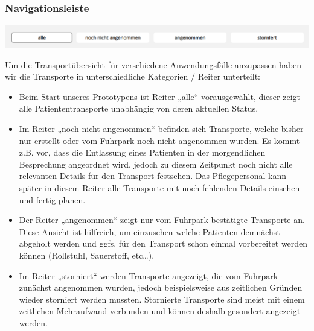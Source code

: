 \documentclass[a4paper, ngerman, 12pt]{scrartcl}
\begin{document}
\subsubsection{Navigationsleiste}
\begin{center}
\begin{minipage}{0.8\textwidth}
	\centering
	\includegraphics[width=\textwidth]{Bilder/ap1Nav.png}
	\label{img:ap1nav}
\end{minipage}
\end{center}
Um die Transportübersicht für verschiedene Anwendungsfälle anzupassen haben wir die Transporte in unterschiedliche Kategorien / Reiter unterteilt:\\
\begin{itemize}
\item Beim Start unseres Prototypens ist Reiter „alle“ vorausgewählt, dieser zeigt alle Patiententransporte unabhängig von deren aktuellen Status.
\item Im Reiter „noch nicht angenommen“ befinden sich Transporte, welche bisher nur erstellt oder vom Fuhrpark noch nicht angenommen wurden. Es kommt z.B. vor, dass die Entlassung eines Patienten in der morgendlichen Besprechung angeordnet wird, jedoch zu diesem Zeitpunkt noch nicht alle relevanten Details für den Transport festsehen. Das Pflegepersonal kann später in diesem Reiter alle Transporte mit noch fehlenden Details einsehen und fertig planen. 
\item Der Reiter „angenommen“ zeigt nur vom Fuhrpark bestätigte Transporte an. Diese Ansicht ist hilfreich, um einzusehen welche Patienten demnächst abgeholt werden und ggfs. für den Transport schon einmal vorbereitet werden können (Rollstuhl, Sauerstoff, etc…). 
\item Im Reiter „storniert“ werden Transporte angezeigt, die vom Fuhrpark zunächst angenommen wurden, jedoch beispielsweise aus zeitlichen Gründen wieder storniert werden mussten. Stornierte Transporte sind meist mit einem zeitlichen Mehraufwand verbunden und können deshalb gesondert angezeigt werden.
\end{itemize}
\end{document}

